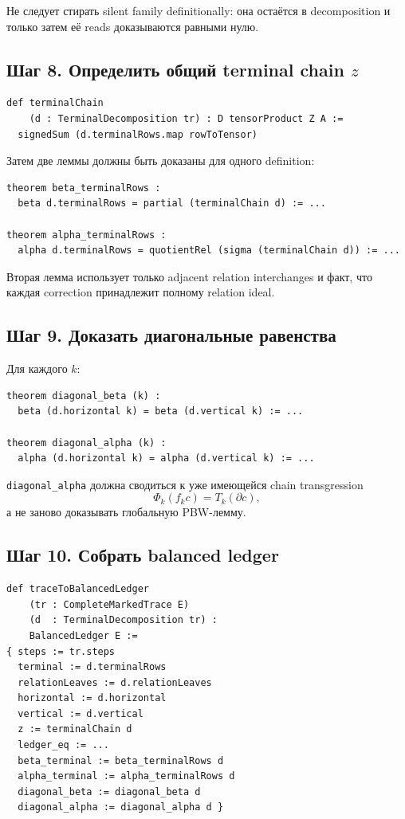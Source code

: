 \documentclass[11pt,a4paper]{article}
\theoremstyle{definition}
\theoremstyle{remark}
\begin{document}
Не следует стирать silent family definitionally: она остаётся в decomposition
и только затем её reads доказываются равными нулю.

\subsection{Шаг 8. Определить общий terminal chain $z$}

\begin{lstlisting}
def terminalChain
    (d : TerminalDecomposition tr) : D tensorProduct Z A :=
  signedSum (d.terminalRows.map rowToTensor)
\end{lstlisting}

Затем две леммы должны быть доказаны для одного definition:

\begin{lstlisting}
theorem beta_terminalRows :
  beta d.terminalRows = partial (terminalChain d) := ...

theorem alpha_terminalRows :
  alpha d.terminalRows = quotientRel (sigma (terminalChain d)) := ...
\end{lstlisting}

Вторая лемма использует только adjacent relation interchanges и факт, что
каждая correction принадлежит полному relation ideal.

\subsection{Шаг 9. Доказать диагональные равенства}

Для каждого $k$:

\begin{lstlisting}
theorem diagonal_beta (k) :
  beta (d.horizontal k) = beta (d.vertical k) := ...

theorem diagonal_alpha (k) :
  alpha (d.horizontal k) = alpha (d.vertical k) := ...
\end{lstlisting}

\texttt{diagonal\_alpha} должна сводиться к уже имеющейся chain transgression
\[
 \Phi_k(f_kc)=T_k(\partial c),
\]
а не заново доказывать глобальную PBW-лемму.

\subsection{Шаг 10. Собрать balanced ledger}

\begin{lstlisting}
def traceToBalancedLedger
    (tr : CompleteMarkedTrace E)
    (d  : TerminalDecomposition tr) :
    BalancedLedger E :=
{ steps := tr.steps
  terminal := d.terminalRows
  relationLeaves := d.relationLeaves
  horizontal := d.horizontal
  vertical := d.vertical
  z := terminalChain d
  ledger_eq := ...
  beta_terminal := beta_terminalRows d
  alpha_terminal := alpha_terminalRows d
  diagonal_beta := diagonal_beta d
  diagonal_alpha := diagonal_alpha d }
\end{lstlisting}
\end{document}

